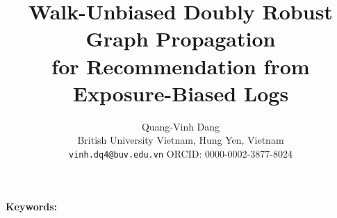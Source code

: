 \documentclass[11pt]{article}
\title{Walk-Unbiased Doubly Robust Graph Propagation\\for Recommendation from Exposure-Biased Logs}
\author{Quang-Vinh Dang\\
British University Vietnam, Hung Yen, Vietnam\\
\texttt{vinh.dq4@buv.edu.vn} \quad ORCID: 0000-0002-3877-8024}
\date{}
\theoremstyle{definition}
\begin{document}
\maketitle

\begin{abstract}

\end{abstract}

\noindent\textbf{Keywords:} 









\appendix




\end{document}
